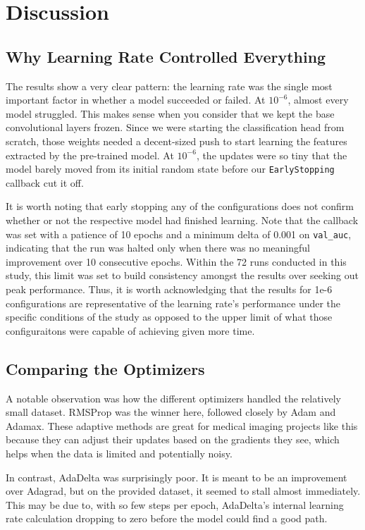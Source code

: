 \section{Discussion}
\label{sec:discussion}

\subsection{Why Learning Rate Controlled Everything}

The results show a very clear pattern: the learning rate was the single most important factor in whether a model succeeded or failed. At $10^{-6}$, almost every model struggled. This makes sense when you consider that we kept the base convolutional layers frozen. Since we were starting the classification head from scratch, those weights needed a decent-sized push to start learning the features extracted by the pre-trained model. At $10^{-6}$, the updates were so tiny that the model barely moved from its initial random state before our \texttt{EarlyStopping} callback cut it off.

It is worth noting that early stopping any of the configurations does not confirm whether or not the respective model had finished learning. Note that the callback was set with a patience of 10 epochs and a minimum delta of 0.001 on \texttt{val\_auc}, indicating that the run was halted only when there was no meaningful improvement over 10 consecutive epochs. Within the 72 runs conducted in this study, this limit was set to build consistency amongst the results over seeking out peak performance. Thus, it is worth acknowledging that the results for 1e-6 configurations are representative of the learning rate's performance under the specific conditions of the study as opposed to the upper limit of what those configuraitons were capable of achieving given more time. 
\subsection{Comparing the Optimizers}

A notable observation was how the different optimizers handled the relatively small dataset. RMSProp was the winner here, followed closely by Adam and Adamax. These adaptive methods are great for medical imaging projects like this because they can adjust their updates based on the gradients they see, which helps when the data is limited and potentially noisy.

In contrast, AdaDelta was surprisingly poor. It is meant to be an improvement over Adagrad, but on the provided dataset, it seemed to stall almost immediately. This may be due to, with so few steps per epoch, AdaDelta's internal learning rate calculation dropping to zero before the model could find a good path. 

